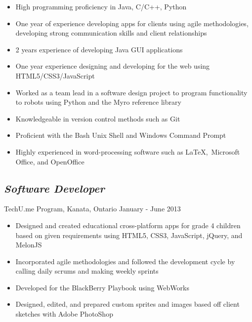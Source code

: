 \documentclass[11pt]{article}
\begin{document}
\begin{minipage}[t]{0.8\linewidth} 
	\begin{itemize}
		\item High programming proficiency in Java, C/C++, Python
		\item One year of experience developing apps for clients using agile methodologies, developing strong 						communication skills and client relationships
		\item 2 years experience of developing Java GUI applications		
		\item One year experience designing and developing for the web using HTML5/CSS3/JavaScript
		\item Worked as a team lead in a software design project to program functionality to robots using Python
				and the Myro reference library
		\item Knowledgeable in version control methods such as Git
		\item Proficient with the Bash Unix Shell and Windows Command Prompt
		\item Highly experienced in word-processing software such as \LaTeX,\ Microsoft Office, and OpenOffice
	\end{itemize} \vspace{12pt}

	\subsection*{\textit{Software Developer}} \vspace{-6pt} 
		TechU.me Program, Kanata, Ontario \hspace{95pt} January - June 2013
		\begin{itemize}
			\item Designed and created educational cross-platform apps for grade 4 children based on given 								requirements using HTML5, CSS3, JavaScript, jQuery, and MelonJS
			\item Incorporated agile methodologies and followed the development cycle by calling daily scrums and 						making weekly sprints
			\item Developed for the BlackBerry Playbook using WebWorks
			\item Designed, edited, and prepared custom sprites and images based off client sketches with Adobe 							PhotoShop
		\end{itemize}
		

\end{minipage}
\end{document}
